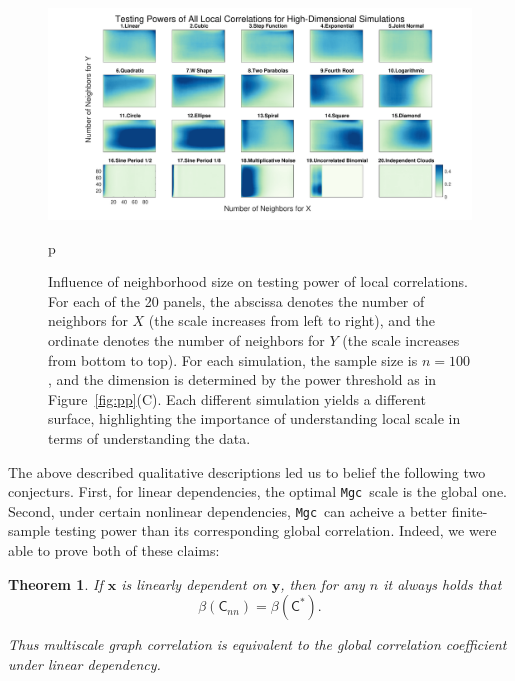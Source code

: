 \documentclass[11pt]{article}
\providecommand{\sct}[1]{{\sc \texttt{#1}}}
\providecommand{\mb}[1]{\boldsymbol{#1}}
\newcommand{\G}{\mathsf{C}}
\newcommand{\Mgc}{\sct{Mgc}}
\newtheorem{thm}{Theorem}
\begin{document}
\begin{figure}[htbp]
\includegraphics[width=1.0\textwidth]{Figures/FigHDHeat}
\caption{Influence of neighborhood size on testing power of local correlations.
For each of the 20 panels, the abscissa denotes the number of neighbors for $X$ (the scale increases from left to right), and the ordinate denotes the number of neighbors for $Y$ (the scale increases from bottom to top). For each simulation, the sample size is $n=100$, and the dimension is determined by the power threshold as in Figure~\ref{fig:pp}(C). Each different simulation yields a different surface, highlighting the importance of understanding local scale in terms of understanding the data. }
\label{figSim6}p
\end{figure}

The above described qualitative descriptions led us to belief the following two conjecturs.  First, for linear dependencies,  the optimal \Mgc~scale is the global one. Second, under certain nonlinear dependencies, \Mgc~can acheive a better finite-sample testing power than its corresponding global correlation. Indeed, we were able to prove both of these claims:

\begin{thm}
\label{thm2}
If $\mb{x}$ is linearly dependent on $\mb{y}$, then for any $n$ it always holds that
\begin{equation}
\beta(\G_{nn}) = \beta(\G^{*}).
\end{equation}

Thus multiscale graph correlation is equivalent to the global correlation coefficient under linear dependency.
\end{thm}
\end{document}
